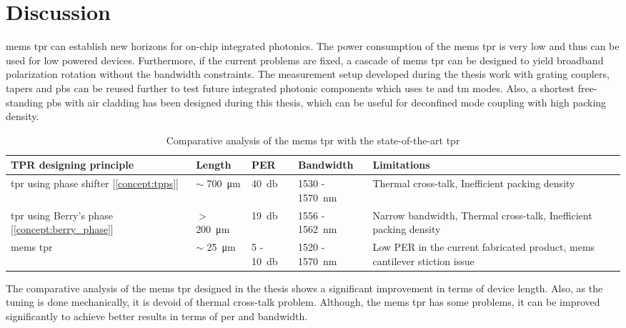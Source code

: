 \documentclass[../report.tex]{subfiles}
\begin{document}
	
	\chapter{Discussion}
\gls{mems} \gls{tpr} can establish new horizons for on-chip integrated photonics. The power consumption of the \gls{mems} \gls{tpr} is very low and thus can be used for low powered devices. Furthermore, if the current problems are fixed, a cascade of \gls{mems} \gls{tpr} can be designed to yield broadband polarization rotation without the bandwidth constraints. The measurement setup developed during the thesis work with grating couplers, tapers and \gls{pbs} can be reused further to test future integrated photonic components which uses \gls{te} and \gls{tm} modes. Also, a shortest free-standing \gls{pbs} with air cladding has been designed during this thesis, which can be useful for deconfined mode coupling with high packing density.
	
\begin {table}[H]
\begin{center} 
	\begin{tabular}{ | m{8em} | m{1.7cm}| m{1.7cm} | m{2.8cm} | m{10em} | }  
		\hline
		\textbf{TPR designing principle} & \textbf{Length} & \textbf{PER} & \textbf{Bandwidth} & \textbf{Limitations} \\ [1.5ex]
		\hline\hline
		\gls{tpr} using phase shifter [\ref{concept:tpps}] & $\sim$ \SI{700}{\micro \meter} & \SI{40}{\decibel} & 1530 - \SI{1570}{\nano \meter} & Thermal cross-talk, Inefficient packing density \\ 
		\hline	
		\gls{tpr} using Berry's phase [\ref{concept:berry_phase}] & $>$ \SI{200}{\micro \meter} & \SI{19}{\decibel} & 1556 - \SI{1562}{\nano \meter}  &  Narrow bandwidth, Thermal cross-talk, Inefficient packing density \\ 
		\hline
		\gls{mems} \gls{tpr} & $\sim$ \SI{25}{\micro \meter} & 5 - \SI{10}{\decibel} & 1520 - \SI{1570}{\nano \meter} & Low PER in the current fabricated product, \gls{mems} cantilever stiction issue \\ [1ex] 
		\hline
	\end{tabular}
\end{center}
\caption {Comparative analysis of the \gls{mems} \gls{tpr} with the state-of-the-art \gls{tpr}} \label{table:tpr_comparision} 
\end {table}

The comparative analysis of the \gls{mems} \gls{tpr} designed in the thesis shows a significant improvement in terms of device length. Also, as the tuning is done mechanically, it is devoid of thermal cross-talk problem.	Although, the \gls{mems} \gls{tpr} has some problems, it can be improved significantly to achieve better results in terms of \gls{per} and bandwidth.
\end{document}
